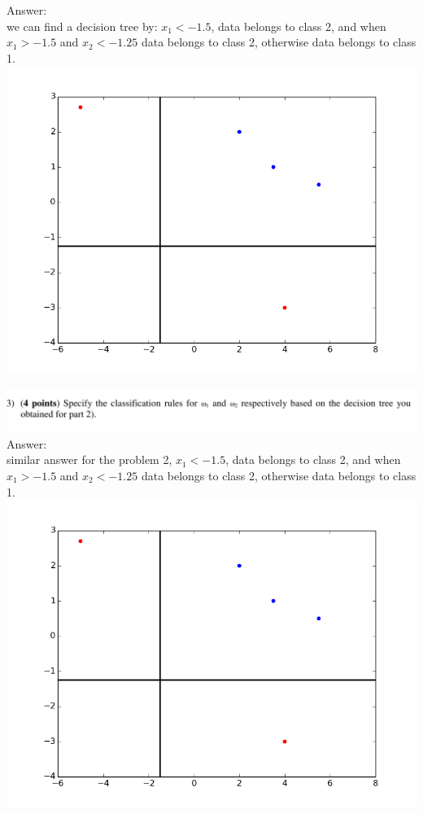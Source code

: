 \documentclass{article}
\begin{document}
Answer:\\
we can find a decision tree by: 
$x_1 < -1.5$, data belongs to class 2, and when $x_1 >-1.5$ and $x_2<-1.25$ data belongs to class 2, otherwise data belongs to class 1.\\
\includegraphics[scale=0.5]{tree_boundary.png}

\includegraphics[width=1\columnwidth]{problem3_3.png}\\
Answer:\\

similar answer for the problem 2,
$x_1 < -1.5$, data belongs to class 2, and when $x_1 >-1.5$ and $x_2<-1.25$ data belongs to class 2, otherwise data belongs to class 1.\\
\includegraphics[scale=0.5]{tree_boundary.png}
\end{document}
